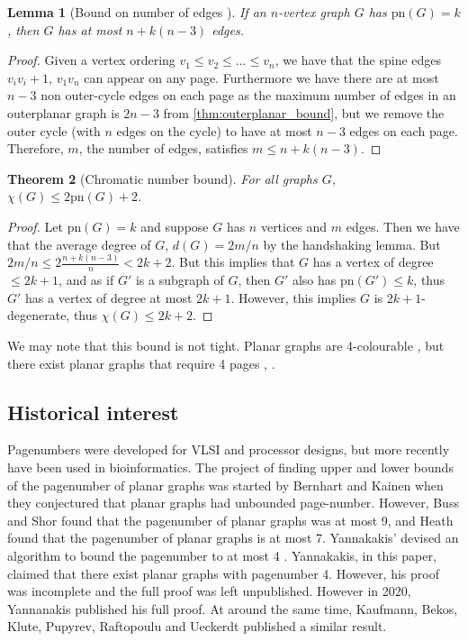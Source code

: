 \documentclass[]{report}
\newcommand{\pn}{\text{pn}}
\newtheorem{theorem}{Theorem}
\newtheorem{lemma}[theorem]{Lemma}
\theoremstyle{definition}
\numberwithin{theorem}{section}
\numberwithin{equation}{section}
\begin{document}
\begin{lemma}[Bound on number of edges \cite{bernhartBookThicknessGraph1979}]\label{lem:Edge_Bound}
	If an $n$-vertex graph $G$ has $\pn(G) = k$, then $G$ has at most $n + k(n-3)$ edges.
\end{lemma}
\begin{proof}
	Given a vertex ordering $v_1 \leq v_2 \leq ... \leq v_n$, we have that the spine edges $v_i v_i+1$, $v_1 v_n$  can appear on any page. Furthermore we have there are at most $n-3$ non outer-cycle edges on each page as the maximum number of edges in an outerplanar graph is $2n - 3$ from \cref{thm:outerplanar_bound}, but we remove the outer cycle (with $n$ edges on the cycle) to have at most $n-3$ edges on each page. Therefore, $m$, the number of edges, satisfies $m \leq n + k (n - 3)$. 
\end{proof}
\begin{theorem}[Chromatic number bound\cite{bernhartBookThicknessGraph1979}]\label{thm:Colouring_Bound}
	For all graphs $G$, $\chi(G) \leq 2 \pn(G) + 2$.
\end{theorem}
\begin{proof}
	Let $\pn(G) = k$ and suppose $G$ has $n$ vertices and $m$ edges. Then we have that the average degree of $G$, $d(G) = 2m/n$ by the handshaking lemma. But $2m/n \leq 2 \frac{n + k(n-3)}{n} < 2k + 2$. But this implies that $G$ has a vertex of degree $\leq 2k + 1$, and as if $G'$ is a subgraph of $G$, then $G'$ also has $\pn(G') \leq k$, thus $G'$ has a vertex of degree at most $2k + 1$. However, this implies $G$ is $2k + 1$-degenerate, thus $\chi(G) \leq 2k + 2$. 
\end{proof}
We may note that this bound is not tight. Planar graphs are 4-colourable \cite{appelEveryPlanarMap1989}, but there exist planar graphs that require 4 pages \cite{yannakakisPlanarGraphsThat2020}, \cite{kaufmannFourPagesAre2020}. 

\subsection{Historical interest}\label{ssec:Pagenumber_History}
Pagenumbers were developed for VLSI and processor designs, but more recently have been used in bioinformatics.
The project of finding upper and lower bounds of the pagenumber of planar graphs was started by Bernhart and Kainen when they conjectured that planar graphs had unbounded page-number. However, Buss and Shor\cite{bussPagenumberPlanarGraphs1984} found that the pagenumber of planar graphs was at most 9, and Heath \cite{heathEmbeddingPlanarGraphs1984} found that the pagenumber of planar graphs is at most 7. Yannakakis' devised an algorithm to bound the pagenumber to at most 4 \cite{yannakakisEmbeddingPlanarGraphs1989}. Yannakakis, in this paper, claimed that there exist planar graphs with pagenumber 4. However, his proof was incomplete and the full proof was left unpublished. However in 2020, Yannanakis published his full proof. \cite{yannakakisPlanarGraphsThat2020} At around the same time, Kaufmann, Bekos, Klute, Pupyrev, Raftopoulu and Ueckerdt published a similar result\cite{kaufmannFourPagesAre2020}. 
\end{document}
